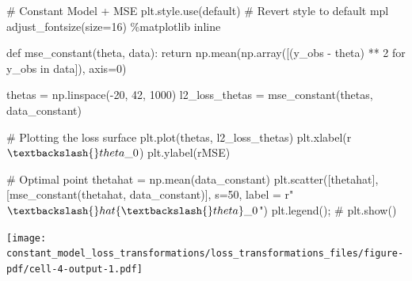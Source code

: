 \documentclass[
  letterpaper,
  DIV=11,
  numbers=noendperiod]{scrreprt}
\newenvironment{Shaded}{\begin{snugshade}}{\end{snugshade}}
\newcommand{\CommentTok}[1]{\textcolor[rgb]{0.37,0.37,0.37}{#1}}
\newcommand{\ControlFlowTok}[1]{\textcolor[rgb]{0.00,0.23,0.31}{#1}}
\newcommand{\DecValTok}[1]{\textcolor[rgb]{0.68,0.00,0.00}{#1}}
\newcommand{\KeywordTok}[1]{\textcolor[rgb]{0.00,0.23,0.31}{#1}}
\newcommand{\NormalTok}[1]{\textcolor[rgb]{0.00,0.23,0.31}{#1}}
\newcommand{\OperatorTok}[1]{\textcolor[rgb]{0.37,0.37,0.37}{#1}}
\newcommand{\StringTok}[1]{\textcolor[rgb]{0.13,0.47,0.30}{#1}}
\newcommand{\VerbatimStringTok}[1]{\textcolor[rgb]{0.13,0.47,0.30}{#1}}
\begin{document}
\begin{Shaded}
\begin{Highlighting}[]
\CommentTok{\# Constant Model + MSE}
\NormalTok{plt.style.use(}\StringTok{\textquotesingle{}default\textquotesingle{}}\NormalTok{) }\CommentTok{\# Revert style to default mpl}
\NormalTok{adjust\_fontsize(size}\OperatorTok{=}\DecValTok{16}\NormalTok{)}
\OperatorTok{\%}\NormalTok{matplotlib inline}

\KeywordTok{def}\NormalTok{ mse\_constant(theta, data):}
    \ControlFlowTok{return}\NormalTok{ np.mean(np.array([(y\_obs }\OperatorTok{{-}}\NormalTok{ theta) }\OperatorTok{**} \DecValTok{2} \ControlFlowTok{for}\NormalTok{ y\_obs }\KeywordTok{in}\NormalTok{ data]), axis}\OperatorTok{=}\DecValTok{0}\NormalTok{)}

\NormalTok{thetas }\OperatorTok{=}\NormalTok{ np.linspace(}\OperatorTok{{-}}\DecValTok{20}\NormalTok{, }\DecValTok{42}\NormalTok{, }\DecValTok{1000}\NormalTok{)}
\NormalTok{l2\_loss\_thetas }\OperatorTok{=}\NormalTok{ mse\_constant(thetas, data\_constant)}

\CommentTok{\# Plotting the loss surface}
\NormalTok{plt.plot(thetas, l2\_loss\_thetas)}
\NormalTok{plt.xlabel(}\VerbatimStringTok{r\textquotesingle{}$\textbackslash{}theta\_0$\textquotesingle{}}\NormalTok{)}
\NormalTok{plt.ylabel(}\VerbatimStringTok{r\textquotesingle{}MSE\textquotesingle{}}\NormalTok{)}

\CommentTok{\# Optimal point}
\NormalTok{thetahat }\OperatorTok{=}\NormalTok{ np.mean(data\_constant)}
\NormalTok{plt.scatter([thetahat], [mse\_constant(thetahat, data\_constant)], s}\OperatorTok{=}\DecValTok{50}\NormalTok{, label }\OperatorTok{=} \VerbatimStringTok{r"$\textbackslash{}hat\{\textbackslash{}theta\}\_0$"}\NormalTok{)}
\NormalTok{plt.legend()}\OperatorTok{;}
\CommentTok{\# plt.show()}
\end{Highlighting}
\end{Shaded}

\texttt{[image: constant\_model\_loss\_transformations/loss\_transformations\_files/figure-pdf/cell-4-output-1.pdf]}
\end{document}

